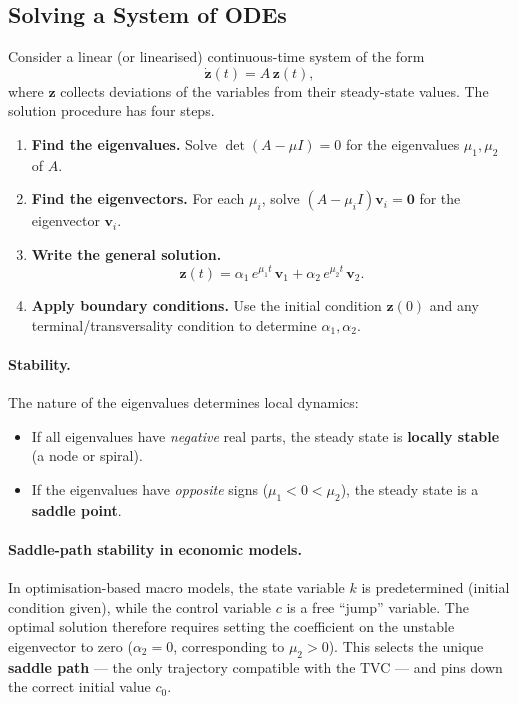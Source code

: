 \subsection{Solving a System of ODEs}

Consider a linear (or linearised) continuous-time system of the form
\begin{equation}
    \dot{\mathbf{z}}(t) = A\,\mathbf{z}(t),
\end{equation}
where $\mathbf{z}$ collects deviations of the variables from their steady-state values.
The solution procedure has four steps.

\begin{enumerate}
    \item \textbf{Find the eigenvalues.} Solve $\det(A - \mu I) = 0$ for the eigenvalues
          $\mu_1, \mu_2$ of $A$.

    \item \textbf{Find the eigenvectors.} For each $\mu_i$, solve
          $(A - \mu_i I)\mathbf{v}_i = \mathbf{0}$ for the eigenvector $\mathbf{v}_i$.

    \item \textbf{Write the general solution.}
          \begin{equation}
              \mathbf{z}(t) = \alpha_1\, e^{\mu_1 t}\,\mathbf{v}_1
                             + \alpha_2\, e^{\mu_2 t}\,\mathbf{v}_2.
          \end{equation}

    \item \textbf{Apply boundary conditions.} Use the initial condition $\mathbf{z}(0)$ and
          any terminal/transversality condition to determine $\alpha_1, \alpha_2$.
\end{enumerate}

\paragraph{Stability.}
The nature of the eigenvalues determines local dynamics:
\begin{itemize}
    \item If all eigenvalues have \emph{negative} real parts, the steady state is
          \textbf{locally stable} (a node or spiral).
    \item If the eigenvalues have \emph{opposite} signs ($\mu_1 < 0 < \mu_2$), the steady
          state is a \textbf{saddle point}.
\end{itemize}

\paragraph{Saddle-path stability in economic models.}
In optimisation-based macro models, the state variable $k$ is predetermined (initial
condition given), while the control variable $c$ is a free ``jump'' variable. The
optimal solution therefore requires setting the coefficient on the unstable
eigenvector to zero ($\alpha_2 = 0$, corresponding to $\mu_2 > 0$). This selects the
unique \textbf{saddle path} — the only trajectory compatible with the TVC — and pins
down the correct initial value $c_0$.


